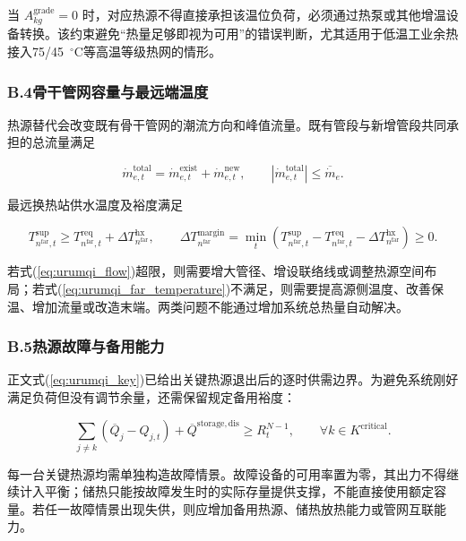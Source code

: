 当 $A_{kg}^{\mathrm{grade}}=0$ 时，对应热源不得直接承担该温位负荷，必须通过热泵或其他增温设备转换。该约束避免“热量足够即视为可用”的错误判断，尤其适用于低温工业余热接入75/45~$^{\circ}$C等高温等级热网的情形。

\subsubsection*{B.4\quad 骨干管网容量与最远端温度}

热源替代会改变既有骨干管网的潮流方向和峰值流量。既有管段与新增管段共同承担的总流量满足

\begin{equation}
\dot m_{e,t}^{\mathrm{total}}=\dot m_{e,t}^{\mathrm{exist}}+\dot m_{e,t}^{\mathrm{new}},
\qquad
|\dot m_{e,t}^{\mathrm{total}}|\leq\overline{\dot m}_e.
\label{eq:urumqi_flow}
\end{equation}

最远换热站供水温度及裕度满足

\begin{equation}
T_{n^{\mathrm{far}},t}^{\mathrm{sup}}
\geq T_{n^{\mathrm{far}},t}^{\mathrm{req}}+\Delta T_{n^{\mathrm{far}}}^{\mathrm{hx}},
\qquad
\Delta T_{n^{\mathrm{far}}}^{\mathrm{margin}}
=\min_t\left(T_{n^{\mathrm{far}},t}^{\mathrm{sup}}-T_{n^{\mathrm{far}},t}^{\mathrm{req}}-\Delta T_{n^{\mathrm{far}}}^{\mathrm{hx}}\right)\geq0.
\label{eq:urumqi_far_temperature}
\end{equation}

若式(\ref{eq:urumqi_flow})超限，则需要增大管径、增设联络线或调整热源空间布局；若式(\ref{eq:urumqi_far_temperature})不满足，则需要提高源侧温度、改善保温、增加流量或改造末端。两类问题不能通过增加系统总热量自动解决。

\subsubsection*{B.5\quad 热源故障与备用能力}

正文式(\ref{eq:urumqi_key})已给出关键热源退出后的逐时供需边界。为避免系统刚好满足负荷但没有调节余量，还需保留规定备用裕度：

\begin{equation}
\sum_{j\neq k}\left(\overline Q_j-Q_{j,t}\right)
+\overline Q^{\mathrm{storage,dis}}
\geq R_t^{N-1},
\qquad \forall k\in K^{\mathrm{critical}}.
\label{eq:urumqi_reserve}
\end{equation}

每一台关键热源均需单独构造故障情景。故障设备的可用率置为零，其出力不得继续计入平衡；储热只能按故障发生时的实际存量提供支撑，不能直接使用额定容量。若任一故障情景出现失供，则应增加备用热源、储热放热能力或管网互联能力。

